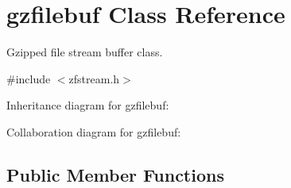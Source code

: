 \hypertarget{classgzfilebuf}{\section{gzfilebuf Class Reference}
\label{classgzfilebuf}
}


Gzipped file stream buffer class.  




{\ttfamily \#include $<$zfstream.\+h$>$}



Inheritance diagram for gzfilebuf\+:


Collaboration diagram for gzfilebuf\+:
\subsection*{Public Member Functions}
